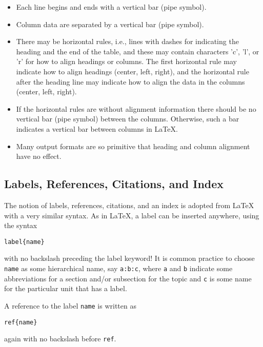 \documentclass[twoside]{article}
\begin{document}
\begin{itemize}
 \item Each line begins and ends with a vertical bar (pipe symbol).

 \item Column data are separated by a vertical bar (pipe symbol).

 \item There may be horizontal rules, i.e., lines with dashes for
   indicating the heading and the end of the table, and these may
   contain characters 'c', 'l', or 'r' for how to align headings or
   columns. The first horizontal rule may indicate how to align
   headings (center, left, right), and the horizontal rule after the
   heading line may indicate how to align the data in the columns
   (center, left, right).

 \item If the horizontal rules are without alignment information there should
   be no vertical bar (pipe symbol) between the columns. Otherwise, such
   a bar indicates a vertical bar between columns in {\LaTeX}.

 \item Many output formats are so primitive that heading and column alignment
   have no effect.
\end{itemize}

\noindent

\subsection{Labels, References, Citations, and Index}

The notion of labels, references, citations, and an index is adopted
from {\LaTeX} with a very similar syntax. As in {\LaTeX}, a label can be
inserted anywhere, using the syntax
\begin{Verbatim}
label{name}
\end{Verbatim}
with no backslash
preceding the label keyword! It is common practice to choose {\fontsize{10pt}{10pt}\verb!name!}
as some hierarchical name, say {\fontsize{10pt}{10pt}\verb!a:b:c!}, where {\fontsize{10pt}{10pt}\verb!a!} and {\fontsize{10pt}{10pt}\verb!b!} indicate
some abbreviations for a section and/or subsection for the topic and
{\fontsize{10pt}{10pt}\verb!c!} is some name for the particular unit that has a label.

A reference to the label {\fontsize{10pt}{10pt}\verb!name!} is written as
\begin{Verbatim}
ref{name}
\end{Verbatim}
again with no backslash before {\fontsize{10pt}{10pt}\verb!ref!}.
\end{document}
